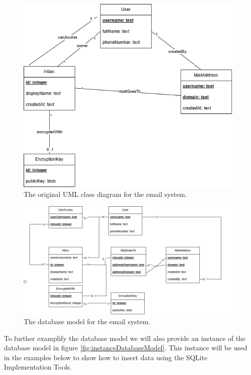 \documentclass[a4paper,10pt,oneside]{article}
\begin{document}
\begin{figure}[h]
    \centering
    \includegraphics[width=1\textwidth]{images/model/original_uml_class_diagram.png}
    \caption{The original UML class diagram for the email system.}
    \label{fig:originalUMLClassDiagram}
\end{figure}

\begin{figure}[h]
    \centering
    \includegraphics[width=1\textwidth]{images/model/database_friendly.png}
    \caption{The database model for the email system.}
    \label{fig:originalDatabaseModel}
\end{figure}

To further examplify the database model we will also provide an instance of the database model in figure \ref{fig:instanceDatabaseModel}. This instance will be used in the examples below to show how to insert data using the SQLite Implementation Tools.
\end{document}
